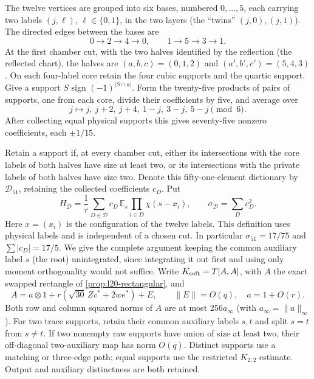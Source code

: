 The twelve vertices are grouped into six bases, numbered
$0,\ldots,5$, each carrying two labels $(j,\ell)$,
$\ell\in\{0,1\}$, in the two layers (the ``twins'' $(j,0),(j,1)$).
The directed edges between the bases are
\begin{equation}\label{eq:merge-local-I-19}
 0\longrightarrow2\longrightarrow4\longrightarrow0,\qquad
 1\longrightarrow5\longrightarrow3\longrightarrow1.
\end{equation}
At the first chamber cut, with the two halves identified by the
reflection (the reflected chart), the halves are
$(a,b,c)=(0,1,2)$ and $(a',b',c')=(5,4,3)$.
On each four-label core retain the four cubic supports and the
quartic support. Give a support $S$ sign $(-1)^{|S\cap a|}$.
Form the twenty-five products of pairs of supports, one from
each core, divide their coefficients by five, and average over
\begin{equation}\label{eq:merge-local-I-20}
 j\mapsto j,\ j+2,\ j+4,\ 1-j,\ 3-j,\ 5-j\pmod6.
\end{equation}
After collecting equal physical supports this gives seventy-five
nonzero coefficients, each $\pm1/15$.

Retain a support if, at every chamber cut, either its
intersections with the core labels of both halves have size at
least two, or its intersections with the private labels of both
halves have size two. Denote this fifty-one-element
dictionary by $\mathcal D_{51}$, retaining the collected
coefficients $c_D$. Put
\begin{equation}\label{eq:merge-local-I-21}
 H_{\mathcal D}
   =\frac1r\sum_{D\in\mathcal D}c_D\,
                \mathbb E_s\prod_{i\in D}\chi(s-x_i),
 \qquad \sigma_{\mathcal D}=\sum_D c_D^2 .
\end{equation}
Here $x=(x_i)$ is the configuration of the twelve labels.
This definition uses physical labels and is independent of a
chosen cut. In particular $\sigma_{51}=17/75$ and
$\sum|c_D|=17/5$.
We give the complete argument keeping the common auxiliary
label $s$ (the root) unintegrated, since integrating it out
first and using only moment orthogonality would not suffice. Write
$K_{\rm soft}=T[A,A]$, with $A$ the exact swapped rectangle of \cref{prop:l20-rectangular}, and
\begin{equation}\label{eq:merge-local-I-23}
 A=a\otimes1+r(\sqrt{30}\,Zv^*+2we^*)+E,\qquad
 \|E\|=O(q),\quad a=1+O(r).
\end{equation}
Both row and column squared norms of $A$ are at most
$256a_\infty$ (with $a_\infty=\|a\|_\infty$). For two trace supports, retain their common
auxiliary labels $s,t$ and split $s=t$ from $s\ne t$.
If two nonempty raw supports have union of size at least two,
their off-diagonal two-auxiliary map has norm $O(q)$.
Distinct supports use a matching or three-edge path; equal
supports use the restricted $K_{2,2}$ estimate. Output and
auxiliary distinctness are both retained.

